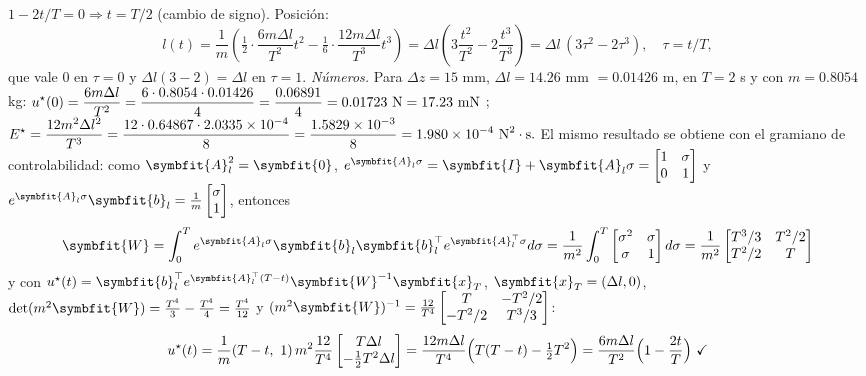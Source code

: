 \documentclass[11pt,a4paper]{article}
\numberwithin{equation}{section}
\newcommand{\vect}[1]{\symbfit{#1}}
\newcommand{\T}{^{\top}}
\begin{document}
$1 - 2t/T = 0 \Rightarrow t = T/2$ (cambio de signo). Posición:
\begin{equation*}
l(t) = \frac1m\left(\tfrac12\cdot\frac{6m\Delta l}{T^2}t^2 - \tfrac16\cdot\frac{12m\Delta l}{T^3}t^3\right) = \Delta l\left(3\frac{t^2}{T^2} - 2\frac{t^3}{T^3}\right) = \Delta l\,(3\tau^2 - 2\tau^3),\quad \tau = t/T,
\end{equation*}
que vale $0$ en $\tau = 0$ y $\Delta l(3 - 2) = \Delta l$ en $\tau = 1$. \emph{Números.} Para $\Delta z = 15$ mm, $\Delta l = 14.26$ mm $= 0.01426$ m, en $T = 2$ s y con $m = 0.8054$ kg:
$\displaystyle u^\star(0)  = \frac{6m\Delta l}{T^2} = \frac{6\cdot0.8054\cdot0.01426}{4} = \frac{0.06891}{4} = 0.01723\ \text{N} = 17.23\ \text{mN}$ ; $\displaystyle E^\star  = \frac{12m^2\Delta l^2}{T^3} = \frac{12\cdot0.64867\cdot2.0335\times10^{-4}}{8} = \frac{1.5829\times10^{-3}}{8} = 1.980\times10^{-4}\ \text{N}^2\cdot\text{s}.$ El mismo resultado se obtiene con el gramiano de controlabilidad: como $\vect A_l^2 = \vect 0$, $e^{\vect A_l\sigma} = \vect I + \vect A_l\sigma = \begin{bmatrix}1 & \sigma\\ 0 & 1\end{bmatrix}$ y $e^{\vect A_l\sigma}\vect b_l = \frac1m\begin{bmatrix}\sigma\\ 1\end{bmatrix}$, entonces
\[
\vect W = \int_0^Te^{\vect A_l\sigma}\vect b_l\vect b_l\T e^{\vect A_l\T\sigma}d\sigma = \frac{1}{m^2}\int_0^T\begin{bmatrix}\sigma^2 & \sigma\\ \sigma & 1\end{bmatrix}d\sigma = \frac{1}{m^2}\begin{bmatrix}T^3/3 & T^2/2\\ T^2/2 & T\end{bmatrix}
\]
y con $u^\star(t) = \vect b_l\T e^{\vect A_l\T(T - t)}\vect W^{-1}\vect x_T$, $\vect x_T = (\Delta l, 0)$, $\det(m^2\vect W) = \frac{T^4}{3} - \frac{T^4}{4} = \frac{T^4}{12}$ y $(m^2\vect W)^{-1} = \frac{12}{T^4}\begin{bmatrix}T & -T^2/2\\ -T^2/2 & T^3/3\end{bmatrix}$:
\[
u^\star(t) = \frac1m(T - t,\ 1)\,m^2\frac{12}{T^4}\begin{bmatrix}T\Delta l\\ -\tfrac12T^2\Delta l\end{bmatrix} = \frac{12m\Delta l}{T^4}\Bigl(T(T - t) - \tfrac12T^2\Bigr) = \frac{6m\Delta l}{T^2}\Bigl(1 - \frac{2t}{T}\Bigr)\ \checkmark
\]
\end{document}
